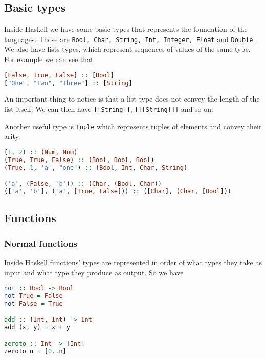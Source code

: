 \subsection{Basic types}
Inside Haskell we have some basic types that represents the foundation of the languages. Those are \texttt{Bool, Char, String, Int, Integer, Float} and \texttt{Double}. \\
We also have lists types, which represent sequences of values of the same type. For example we can see that 

\begin{lstlisting}[language=haskell]
[False, True, False] :: [Bool]
["One", "Two", "Three"] :: [String]
\end{lstlisting}

An important thing to notice is that a list type does not convey the length of the list itself. We can then have \texttt{[[String]]}, \texttt{[[[String]]]} and so on.
\linebreak \linebreak

Another useful type is \texttt{Tuple} which represents tuples of elements and convey their arity. 

\begin{lstlisting}[language=haskell]
(1, 2) :: (Num, Num)
(True, True, False) :: (Bool, Bool, Bool)
(True, 1, 'a', "one") :: (Bool, Int, Char, String)

('a', (False, 'b')) :: (Char, (Bool, Char))
(['a', 'b'], ('a', [True, False])) :: ([Char], (Char, [Bool]))
\end{lstlisting}


\subsection{Functions}
\subsubsection{Normal functions}
Inside Haskell functions' types are represented in order of what types they take as input and what type they produce as output. So we have

\begin{lstlisting}[language=haskell]
not :: Bool -> Bool
not True = False
not False = True

add :: (Int, Int) -> Int
add (x, y) = x + y

zeroto :: Int -> [Int]
zeroto n = [0..n]
\end{lstlisting}

